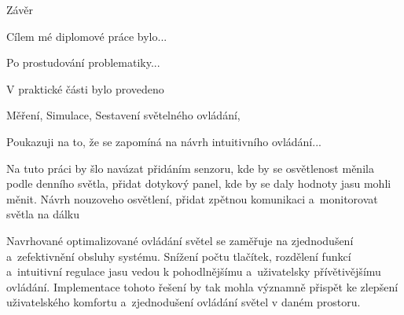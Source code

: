 \chap Závěr

Cílem mé diplomové práce bylo...

Po prostudování problematiky...

V praktické části bylo provedeno

Měření, Simulace, Sestavení světelného ovládání,

Poukazuji na to, že se zapomíná na návrh intuitivního ovládání...

Na tuto práci by šlo navázat přidáním senzoru, kde by se osvětlenost měnila podle denního světla, přidat dotykový panel, kde by se daly hodnoty
jasu mohli měnit. Návrh nouzoveho osvětlení, přidat zpětnou komunikaci a~monitorovat světla na dálku

Navrhované optimalizované ovládání světel se zaměřuje na zjednodušení a~zefektivnění obsluhy systému.
Snížení počtu tlačítek, rozdělení funkcí a~intuitivní regulace jasu vedou
k pohodlnějšímu a~uživatelsky přívětivějšímu ovládání.
Implementace tohoto řešení by tak mohla významně přispět
ke zlepšení uživatelského komfortu a~zjednodušení ovládání světel v daném prostoru.

